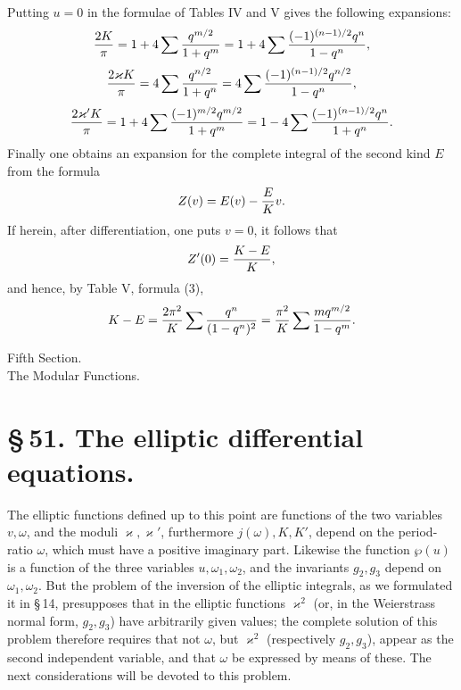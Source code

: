 \documentclass[11pt]{article}
\begin{document}
Putting $u=0$ in the formulae of Tables IV and V gives the following expansions:
\[
{2K\over\pi}=1+4\sum{q^{m/2}\over1+q^m}
=1+4\sum{(-1)^{(n-1)/2}q^n\over1-q^n},
\]
\[
{2\varkappa K\over\pi}=4\sum{q^{n/2}\over1+q^n}
=4\sum{(-1)^{(n-1)/2}q^{n/2}\over1-q^n},
\]
\[
{2\varkappa' K\over\pi}=1+4\sum{(-1)^{m/2}q^{m/2}\over1+q^m}
=1-4\sum{(-1)^{(n-1)/2}q^n\over1+q^n}.
\]
Finally one obtains an expansion for the complete integral of the second kind $E$ from the formula
\[
Z(v)=E(v)-{E\over K}v.
\]
If herein, after differentiation, one puts $v=0$, it follows that
\[
Z'(0)={K-E\over K},
\]
and hence, by Table V, formula (3),
\[
K-E={2\pi^2\over K}\sum {q^n\over(1-q^n)^2}
={\pi^2\over K}\sum {m q^{m/2}\over1-q^m}.
\]

\begin{center}
{\large Fifth Section.}\\[0.7em]
{\Large The Modular Functions.}
\end{center}

\section*{\S\,51. The elliptic differential equations.}

The elliptic functions defined up to this point are functions of the two variables $v,\omega$, and the moduli $\varkappa,\varkappa'$, furthermore $j(\omega),K,K'$, depend on the period-ratio $\omega$, which must have a positive imaginary part. Likewise the function $\wp(u)$ is a function of the three variables $u,\omega_1,\omega_2$, and the invariants $g_2,g_3$ depend on $\omega_1,\omega_2$. But the problem of the inversion of the elliptic integrals, as we formulated it in \S\,14, presupposes that in the elliptic functions $\varkappa^2$ (or, in the Weierstrass normal form, $g_2,g_3$) have arbitrarily given values; the complete solution of this problem therefore requires that not $\omega$, but $\varkappa^2$ (respectively $g_2,g_3$), appear as the second independent variable, and that $\omega$ be expressed by means of these. The next considerations will be devoted to this problem.
\end{document}
